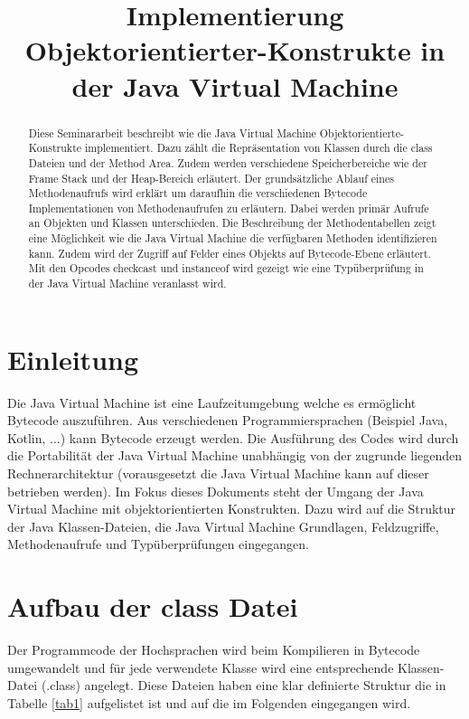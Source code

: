 \documentclass[conference]{IEEEtran}
\begin{document}
\title{Implementierung Objektorientierter-Konstrukte in der Java Virtual Machine\\}

\author{
}

\maketitle

\begin{abstract}
Diese Seminararbeit beschreibt wie die Java Virtual Machine Objektorientierte-Konstrukte implementiert. Dazu zählt die Repräsentation von Klassen durch die class Dateien und der Method Area. Zudem werden verschiedene Speicherbereiche wie der Frame Stack und der Heap-Bereich erläutert. Der grundsätzliche Ablauf eines Methodenaufrufs wird erklärt um daraufhin die verschiedenen Bytecode Implementationen von Methodenaufrufen zu erläutern. Dabei werden primär Aufrufe an Objekten und Klassen unterschieden. Die Beschreibung der Methodentabellen zeigt eine Möglichkeit wie die Java Virtual Machine die verfügbaren Methoden identifizieren kann. Zudem wird der Zugriff auf Felder eines Objekts auf Bytecode-Ebene erläutert. Mit den Opcodes checkcast und instanceof wird gezeigt wie eine Typüberprüfung in der Java Virtual Machine veranlasst wird.
\end{abstract}



\section{Einleitung}
Die Java Virtual Machine ist eine Laufzeitumgebung welche es ermöglicht Bytecode auszuführen. Aus verschiedenen Programmiersprachen (Beispiel Java, Kotlin, ...) kann  Bytecode erzeugt werden. Die Ausführung des Codes wird durch die Portabilität der Java Virtual Machine unabhängig von der zugrunde liegenden Rechnerarchitektur (vorausgesetzt die Java Virtual Machine kann auf dieser betrieben werden). Im Fokus dieses Dokuments steht der Umgang der Java Virtual Machine mit objektorientierten Konstrukten. Dazu wird auf die Struktur der Java Klassen-Dateien, die Java Virtual Machine Grundlagen, Feldzugriffe, Methodenaufrufe und Typüberprüfungen eingegangen.

\section{Aufbau der class Datei}
\label{chKlassenDatei}
Der Programmcode der Hochsprachen wird beim Kompilieren in Bytecode umgewandelt und für jede verwendete Klasse wird eine entsprechende Klassen-Datei (.class) angelegt. Diese Dateien haben eine klar definierte Struktur die in Tabelle \ref{tab1} aufgelistet ist und auf die im Folgenden eingegangen wird.
\end{document}
